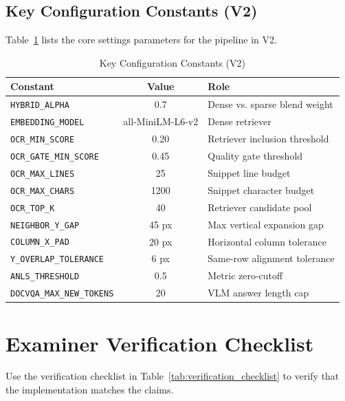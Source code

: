 \documentclass[11pt,a4paper]{article}
\begin{document}
\subsection{Key Configuration Constants (V2)}
Table~\ref{tab:config_constants} lists the core settings parameters for the pipeline in V2.

\begin{table}[H]
\centering
\caption{Key Configuration Constants (V2)}
\label{tab:config_constants}
\begin{tabular}{|l|c|l|}
\hline
\textbf{Constant} & \textbf{Value} & \textbf{Role} \\ \hline
\texttt{HYBRID\_ALPHA} & 0.7 & Dense vs. sparse blend weight \\ \hline
\texttt{EMBEDDING\_MODEL} & all-MiniLM-L6-v2 & Dense retriever \\ \hline
\texttt{OCR\_MIN\_SCORE} & 0.20 & Retriever inclusion threshold \\ \hline
\texttt{OCR\_GATE\_MIN\_SCORE} & 0.45 & Quality gate threshold \\ \hline
\texttt{OCR\_MAX\_LINES} & 25 & Snippet line budget \\ \hline
\texttt{OCR\_MAX\_CHARS} & 1200 & Snippet character budget \\ \hline
\texttt{OCR\_TOP\_K} & 40 & Retriever candidate pool \\ \hline
\texttt{NEIGHBOR\_Y\_GAP} & 45 px & Max vertical expansion gap \\ \hline
\texttt{COLUMN\_X\_PAD} & 20 px & Horizontal column tolerance \\ \hline
\texttt{Y\_OVERLAP\_TOLERANCE} & 6 px & Same-row alignment tolerance \\ \hline
\texttt{ANLS\_THRESHOLD} & 0.5 & Metric zero-cutoff \\ \hline
\texttt{DOCVQA\_MAX\_NEW\_TOKENS} & 20 & VLM answer length cap \\ \hline
\end{tabular}
\end{table}

\newpage
\section{Examiner Verification Checklist}
Use the verification checklist in Table~\ref{tab:verification_checklist} to verify that the implementation matches the claims.
\end{document}
